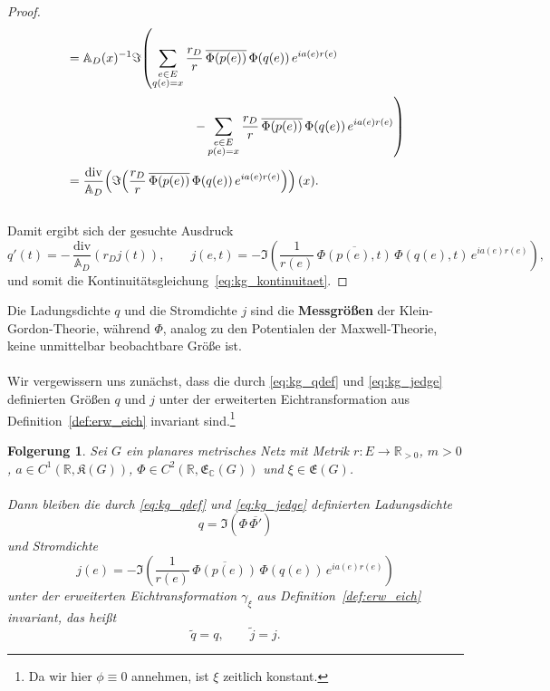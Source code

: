 \documentclass[11pt,a4paper,leqno]{report}
\newtheorem{corollary}[theorem]{Folgerung}
\numberwithin{equation}{chapter}
\begin{document}
\begin{proof}
\begin{align*}
		&=\mathbb{A}_D(x)^{-1}\Im\!\left(
		\sum_{\substack{e\in E \\ q(e)=x}}
		\frac{r_D}{r}\,
		\overline{\Phi(p(e))}\,
		\Phi(q(e))\,
		e^{i a(e)r(e)}
		\right. \\[2pt]
		&\hspace{3.5cm}\left.
		- 
		\sum_{\substack{e\in E \\ p(e)=x}}
		\frac{r_D}{r}\,
		\overline{\Phi(p(e))}\,
		\Phi(q(e))\,
		e^{i a(e)r(e)} 
		\right) \\[4pt]
		&= \frac{\mathrm{div}}{\mathbb{A}_D}\!\left(
		\Im\!\left(
		\frac{r_D}{r}\,
		\overline{\Phi(p(e))}\,
		\Phi(q(e))\,
		e^{i a(e)r(e)}
		\right)
		\right)(x).
	\end{align*}
	\\
	Damit ergibt sich der gesuchte Ausdruck
	\[
	q'(t) = -\,\frac{\mathrm{div}}{\mathbb{A}_D}(r_Dj(t)), \qquad
	j(e,t) = -\Im\!\left(
	\frac{1}{r(e)}\,
	\overline{\Phi(p(e),t)}\,
	\Phi(q(e),t)\,
	e^{i a(e)r(e)}
	\right),
	\]
	und somit die Kontinuitätsgleichung~\eqref{eq:kg_kontinuitaet}.
\end{proof}
\noindent
\noindent
Die Ladungsdichte \(q\) und die Stromdichte \(j\) sind die \textbf{Messgrößen} 
der Klein-Gordon-Theorie, während \(\Phi\), analog zu den Potentialen der 
Maxwell-Theorie, keine unmittelbar beobachtbare Größe ist.\\
\\
Wir vergewissern uns zunächst, dass die durch \eqref{eq:kg_qdef} und 
\eqref{eq:kg_jedge} definierten Größen \(q\) und \(j\) unter der erweiterten 
Eichtransformation aus Definition~\ref{def:erw_eich} invariant sind.\footnote{Da wir hier 
	$\phi \equiv 0$ annehmen, ist $\xi$ zeitlich konstant.} 
\begin{corollary}\label{cor:eichinvarianz_qj}
		Sei \(G\) ein planares metrisches Netz mit Metrik \(r : E \to \mathbb{R}_{>0}\), \(m>0\), 
		\(a\in C^1(\mathbb R,\mathfrak K(G))\), 
		\(\Phi\in C^2(\mathbb R,\mathfrak E_{\mathbb C}(G))\) und 
		\(\xi\in\mathfrak E(G)\). \\
		\\
		Dann bleiben die durch \eqref{eq:kg_qdef} und \eqref{eq:kg_jedge} definierten 
		Ladungsdichte
		\[
		q=\Im(\Phi\,\overline{\Phi'})
		\]
		und Stromdichte
		\[
		j(e)=-\Im\!\left(
		\frac1{r(e)}\,
		\overline{\Phi(p(e))}\,
		\Phi(q(e))\,
		e^{ia(e)r(e)}
		\right)
		\]
		unter der erweiterten Eichtransformation \(\gamma_\xi\) aus 
		Definition~\ref{def:erw_eich} invariant, das heißt
		\[
		\tilde q=q,
		\qquad
		\tilde j=j.
		\]
	\end{corollary}
\end{document}

